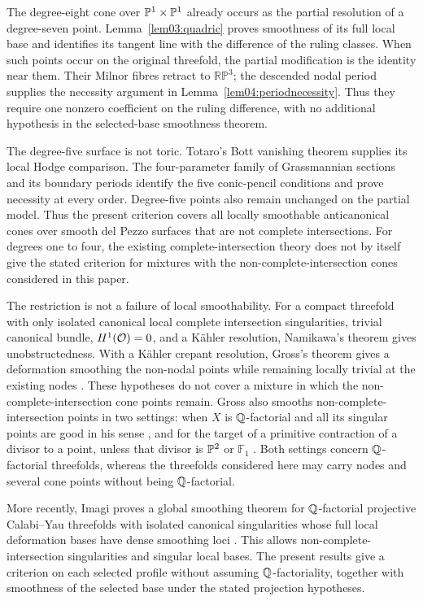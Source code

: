 The degree-eight cone over $\mathbb{P}^1\times\mathbb{P}^1$ already occurs as the
partial resolution of a degree-seven point.
Lemma~\ref{lem03:quadric} proves smoothness of its full local base and
identifies its tangent line with the difference of the ruling classes.
When such points occur on the original threefold, the partial
modification is the identity near them.  Their Milnor fibres retract
to $\mathbb{RP}^3$; the descended nodal period supplies the necessity
argument in Lemma~\ref{lem04:periodnecessity}.  Thus they require one
nonzero coefficient on the ruling difference, with no additional
hypothesis in the selected-base smoothness theorem.

The degree-five surface is not toric.  Totaro's Bott vanishing
theorem \cite{totaro2020} supplies its local Hodge comparison.
The four-parameter family of Grassmannian sections and its
boundary periods identify the five conic-pencil conditions and
prove necessity at every order.  Degree-five points also remain
unchanged on the partial model.  Thus the present criterion covers
all locally smoothable anticanonical cones over smooth del Pezzo
surfaces that are not complete intersections.
For degrees one to four, the existing complete-intersection theory
does not by itself give the stated criterion for mixtures with the
non-complete-intersection cones considered in this paper.

The restriction is not a failure of local smoothability.  For a compact
threefold with only isolated canonical local complete intersection
singularities, trivial canonical bundle, $H^1(\mathcal{O})=0$, and a K\"ahler
resolution, Namikawa's theorem gives unobstructedness.  With a K\"ahler
crepant resolution, Gross's theorem gives a deformation smoothing the
non-nodal points while remaining locally trivial at the existing nodes
\cite[Theorems~0.3 and~0.5]{FL22a}.  These hypotheses do not cover a
mixture in which the non-complete-intersection cone points remain.  Gross
also smooths non-complete-intersection points in two settings: when $X$ is
$\mathbb{Q}$-factorial and all its singular points are good in his sense
\cite[Thm.~4.3]{Gross97rev}, and for the target of a primitive contraction of
a divisor to a point, unless that divisor is $\mathbb{P}^2$ or $\mathbb F_1$
\cite[Thm.~5.8]{Gross97rev}.  Both settings concern $\mathbb{Q}$-factorial threefolds,
whereas the threefolds considered here may carry nodes and several cone points
without being $\mathbb{Q}$-factorial.

More recently, Imagi proves a global smoothing theorem for
$\mathbb{Q}$-factorial projective Calabi--Yau threefolds with isolated canonical
singularities whose full local deformation bases have dense smoothing
loci \cite[Theorems~1.8--1.9 and Corollary~1.10]{Imagi26}.
This allows non-complete-intersection singularities and singular local
bases.  The present results give a criterion on each selected profile
without assuming $\mathbb{Q}$-factoriality, together with smoothness of the
selected base under the stated projection hypotheses.

